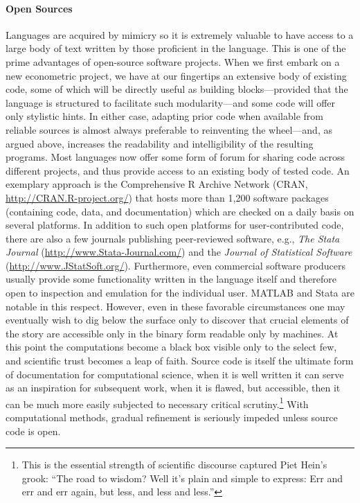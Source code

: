 \documentclass[10pt,a4paper,twoside]{article}
\let\proglang=\textsf
\begin{document}
\paragraph{Open Sources}
Languages are acquired by mimicry so it is extremely valuable to have access to a
large body of text written by those proficient in the language.  This is one of
the prime advantages of open-source software projects. 
When we first embark on a new econometric project, we have at our fingertips an 
extensive body of existing code, some of which will be directly useful as building 
blocks---provided that the language is structured to facilitate such modularity---and
some code will offer only stylistic hints.  In either case, adapting prior code
when available from reliable sources is almost always preferable to reinventing
the wheel---and, as argued above, increases the readability and intelligibility 
of the resulting programs.
Most languages now offer some form of forum for sharing code across different
projects, and thus provide access to an existing body of tested code. An
exemplary approach is the Comprehensive \proglang{R} Archive Network
(CRAN, \url{http://CRAN.R-project.org/}) that hosts more than 1,200 software
packages (containing code, data, and documentation) which are checked on 
a daily basis on several platforms.
In addition to such open platforms for user-contributed code,
there are also a few journals publishing peer-reviewed software, e.g.,
\emph{The Stata Journal} (\url{http://www.Stata-Journal.com/}) and the
\emph{Journal of Statistical Software} (\url{http://www.JStatSoft.org/}).
Furthermore, even commercial software producers usually provide some functionality written in
the language itself and therefore open to inspection and emulation for the individual user.  
\proglang{MATLAB} and \proglang{Stata} \citep[\url{http://www.Stata.com/}]{repro:Stata:2007}
are notable in this respect. However, even in these favorable circumstances 
one may eventually wish to dig below the surface only to discover that crucial
elements of the story are accessible only in the binary form readable only
by machines.  At this point the computations become a black box visible only
to the select few, and scientific trust becomes a leap of faith.
Source code is itself the ultimate form of documentation for computational
science, when it is well written it can serve as an inspiration for subsequent
work, when it is flawed, but accessible, then it can be much more easily 
subjected to necessary critical scrutiny.\footnote{   This is the essential strength
of scientific discourse captured Piet Hein's grook:  ``The road to wisdom?  Well
it's plain and simple to express:  Err and err and err again, but less, and less
and less.''}  With computational methods, gradual refinement is seriously impeded
unless source code is open.
\end{document}

